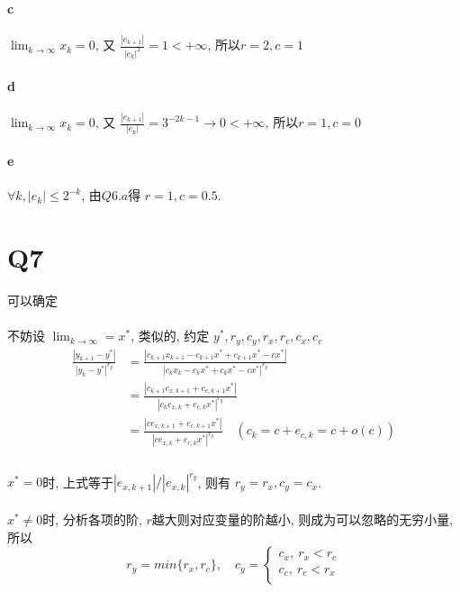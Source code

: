 \documentclass{article}
\begin{document}
\begin{CJK}{UTF8}{gbsn}
  \paragraph{c}
    $\lim_{k \to \infty} x_k = 0$, 又 $\frac{|e_{k + 1}|}{|e_k|^2} = 1 < +\infty$, 所以$r = 2, c = 1$
  \paragraph{d}
    $\lim_{k \to \infty} x_k = 0$, 又 $\frac{|e_{k + 1}|}{|e_k|} = 3^{-2k - 1} \to 0 < +\infty$, 所以$r = 1, c = 0$
  \paragraph{e}
    $\forall k, |e_k| \leq 2^{-k}$, 由$Q6.a$得 $r = 1, c = 0.5$.

\section{Q7}
  可以确定
  \paragraph{}
  不妨设 $\lim_{k \to \infty} = x^*$, 类似的, 约定 $y^*, r_y, c_y, r_x, r_c, c_x, c_c$
  \begin{equation}
    \begin{aligned}
      \frac{|y_{k + 1} - y^*|}{|y_k - y^*|^{r_y}} & = \frac{|c_{k + 1}x_{k + 1} - c_{k + 1}x^* + c_{k + 1}x^* - cx^*|}{|c_{k}x_{k} - c_{k}x^* + c_{k}x^* - cx^*|^{r_y}} \\
      & = \frac{|c_{k + 1}e_{x, k + 1} + e_{c, k + 1}x^*|}{|c_{k}e_{x, k} + e_{c, k}x^*|^{r_y}} \\
      & = \frac{|ce_{x, k + 1} + e_{c, k + 1}x^*|}{|ce_{x, k} + e_{c, k}x^*|^{r_y}} \quad (c_k = c + e_{c, k} = c + o(c)) \\
    \end{aligned}
  \end{equation}
  \paragraph{}
    $x^* = 0$时, 上式等于$|e_{x, k + 1}| / |e_{x, k}|^{r_y}$, 则有 $r_y = r_x, c_y = c_x$.
  \paragraph{}
    $x^* \not= 0$时, 分析各项的阶, $r$越大则对应变量的阶越小, 则成为可以忽略的无穷小量, 所以
    \begin{equation}
      r_y = min\{r_x, r_c\},\quad c_y =
      \begin{cases}
        c_x,\ r_x < r_c \\
        c_c,\ r_c < r_x \\
      \end{cases}
    \end{equation}

\end{CJK}
\end{document}
